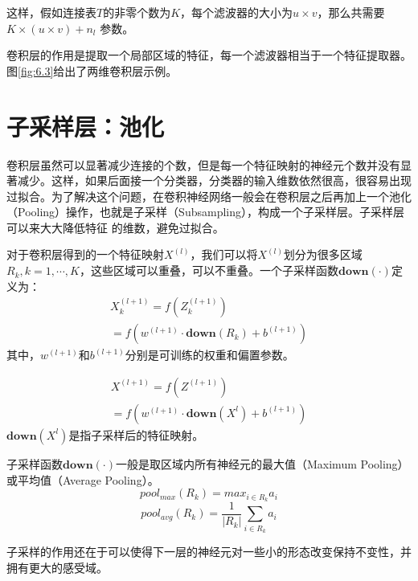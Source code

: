 \documentclass[11pt,fleqn, UTF8]{ctexbook} %
\begin{document}
这样，假如连接表$T$的非零个数为$K$，每个滤波器的大小为$u \times v$，那么共需要$K \times (u \times  v) + n_l$ 参数。

卷积层的作用是提取一个局部区域的特征，每一个滤波器相当于一个特征提取器。图\ref{fig:6.3}给出了两维卷积层示例。
\section{子采样层：池化}

卷积层虽然可以显著减少连接的个数，但是每一个特征映射的神经元个数并没有显著减少。这样，如果后面接一个分类器，分类器的输入维数依然很高，很容易出现过拟合。为了解决这个问题，在卷积神经网络一般会在卷积层之后再加上一个池化（Pooling）操作，也就是子采样（Subsampling），构成一个子采样层。子采样层可以来大大降低特征
的维数，避免过拟合。

对于卷积层得到的一个特征映射$X^{(l)}$，我们可以将$X^{(l)}$划分为很多区域$R_k, k=1,\cdots ,K$，这些区域可以重叠，可以不重叠。一个子采样函数$\boldsymbol{down}(\cdot)$定义为：
\begin{gather}\label{6.10}
  X_k^{(l+1)}=f(Z_k^{(l+1)}) \\
  =f\left( w^{(l+1)}\cdot \boldsymbol{down}(R_k) + b^{(l+1)} \right)
\end{gather}
其中，$w^{(l+1)}$和$b^{(l+1)}$分别是可训练的权重和偏置参数。

\begin{gather}\label{6.12}
  X^{(l+1)}=f(Z^{(l+1)}) \\
  =f\left( w^{(l+1)}\cdot \boldsymbol{down}(X^l) + b^{(l+1)} \right)
\end{gather}
$\boldsymbol{down}(X^l)$是指子采样后的特征映射。

子采样函数$\boldsymbol{down}(\cdot)$一般是取区域内所有神经元的最大值（Maximum Pooling）或平均值（Average Pooling）。
\begin{equation}\label{6.14}
  pool_{max}(R_k)=max_{i\in R_k}a_i
\end{equation}
\begin{equation}\label{6.15}
  pool_{avg}(R_k)=\frac{1}{|R_k|}\sum_{i\in R_k}a_i
\end{equation}

子采样的作用还在于可以使得下一层的神经元对一些小的形态改变保持不变性，并拥有更大的感受域。
\end{document}
